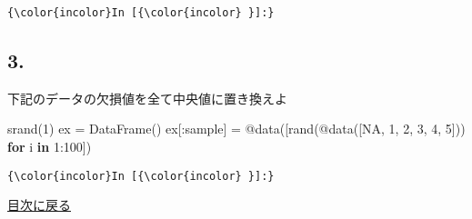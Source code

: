 \documentclass[a4paper,dvipdfmx,uplatex]{jsarticle}
\newenvironment{Shaded}{}{}
\newcommand{\KeywordTok}[1]{\textcolor[rgb]{0.00,0.44,0.13}{\textbf{{#1}}}}
\newcommand{\FloatTok}[1]{\textcolor[rgb]{0.25,0.63,0.44}{{#1}}}
\newcommand{\NormalTok}[1]{{#1}}
\begin{document}
    \begin{Verbatim}[commandchars=\\\{\}]
{\color{incolor}In [{\color{incolor} }]:} 
\end{Verbatim}

    \subsection{3.}\label{section}

下記のデータの欠損値を全て中央値に置き換えよ

\begin{Shaded}
\begin{Highlighting}[]
\NormalTok{srand(}\FloatTok{1}\NormalTok{)}
\NormalTok{ex = DataFrame()}
\NormalTok{ex[:sample] = @data([rand(@data([NA, }\FloatTok{1}\NormalTok{, }\FloatTok{2}\NormalTok{, }\FloatTok{3}\NormalTok{, }\FloatTok{4}\NormalTok{, }\FloatTok{5}\NormalTok{])) }\KeywordTok{for} \NormalTok{i }\KeywordTok{in} \FloatTok{1}\NormalTok{:}\FloatTok{100}\NormalTok{])}
\end{Highlighting}
\end{Shaded}

    \begin{Verbatim}[commandchars=\\\{\}]
{\color{incolor}In [{\color{incolor} }]:} 
\end{Verbatim}

    \protect\hyperlink{ux76eeux6b21}{目次に戻る}


    
    
    
    
\end{document}
